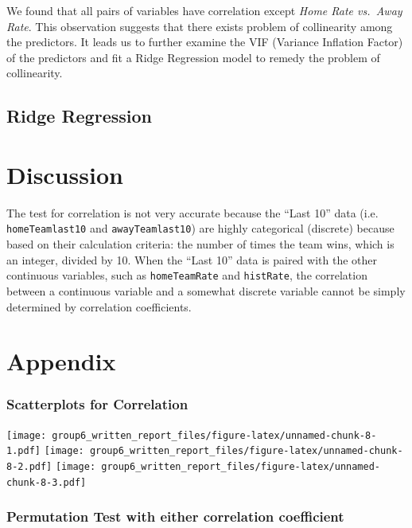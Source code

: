 \documentclass[]{article}
\begin{document}
We found that all pairs of variables have correlation except \emph{Home
Rate vs.~Away Rate}. This observation suggests that there exists problem
of collinearity among the predictors. It leads us to further examine the
VIF (Variance Inflation Factor) of the predictors and fit a Ridge
Regression model to remedy the problem of collinearity.

\hypertarget{ridge-regression-1}{%
\subsection{Ridge Regression}\label{ridge-regression-1}}

\hypertarget{discussion}{%
\section{Discussion}\label{discussion}}

The test for correlation is not very accurate because the ``Last 10''
data (i.e. \texttt{homeTeamlast10} and \texttt{awayTeamlast10}) are
highly categorical (discrete) because based on their calculation
criteria: the number of times the team wins, which is an integer,
divided by 10. When the ``Last 10'' data is paired with the other
continuous variables, such as \texttt{homeTeamRate} and
\texttt{histRate}, the correlation between a continuous variable and a
somewhat discrete variable cannot be simply determined by correlation
coefficients.

\newpage

\hypertarget{appendix}{%
\section{Appendix}\label{appendix}}

\hypertarget{scatterplots-for-correlation}{%
\subsubsection{Scatterplots for
Correlation}\label{scatterplots-for-correlation}}

\texttt{[image: group6\_written\_report\_files/figure-latex/unnamed-chunk-8-1.pdf]}
\texttt{[image: group6\_written\_report\_files/figure-latex/unnamed-chunk-8-2.pdf]}
\texttt{[image: group6\_written\_report\_files/figure-latex/unnamed-chunk-8-3.pdf]}

\hypertarget{permutation-test-with-either-correlation-coefficient}{%
\subsubsection{Permutation Test with either correlation
coefficient}\label{permutation-test-with-either-correlation-coefficient}}
\end{document}
